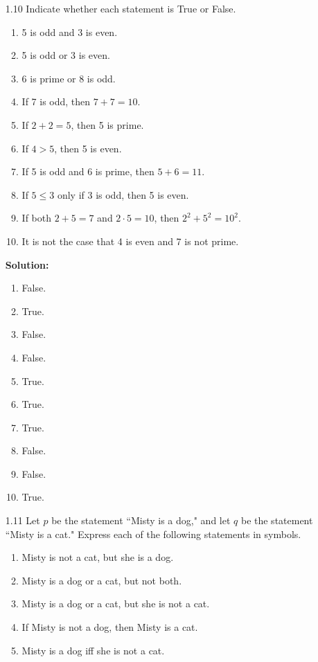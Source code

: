 \begin{enumerate}
   \item[1.10] Indicate whether each statement is True or False.
      \begin{enumerate}
         \item 5 is odd and 3 is even.
         \item 5 is odd or 3 is even.
         \item 6 is prime or 8 is odd.
         \item If 7 is odd, then $7 + 7 = 10$.
         \item If $2 + 2 = 5$, then 5 is prime.
         \item If $4 > 5$, then 5 is even.
         \item If 5 is odd and 6 is prime, then $5 + 6 = 11$.
         \item If $5 \le 3$ only if 3 is odd, then 5 is even.
         \item If both $2 + 5 = 7$ and $2 \cdot 5 = 10$,
               then $2^2 + 5^2 = 10^2$.
         \item It is not the case that 4 is even and 7 is not prime.
      \end{enumerate}

      \textbf{Solution:}

      \begin{enumerate}
         \item False.
         \item True.
         \item False.
         \item False.
         \item True.
         \item True.
         \item True.
         \item False.
         \item False.
         \item True.
      \end{enumerate}

   \item[1.11] Let $p$ be the statement ``Misty is a dog," and let $q$ be the
               statement ``Misty is a cat." Express each of the following
               statements in symbols.
      \begin{enumerate}
         \item Misty is not a cat, but she is a dog.
         \item Misty is a dog or a cat, but not both.
         \item Misty is a dog or a cat, but she is not a cat.
         \item If Misty is not a dog, then Misty is a cat.
         \item Misty is a dog iff she is not a cat.
      \end{enumerate}


\end{enumerate}
